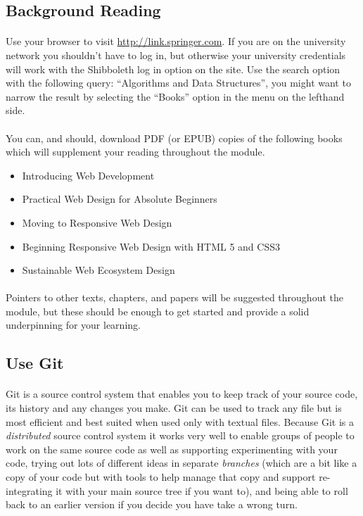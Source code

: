 \documentclass[10pt, a4paper]{article}
\begin{document}
\subsection{Background Reading}

\paragraph{} Use your browser to visit \url{http://link.springer.com}. If you are on the university network you shouldn't have to log in, but otherwise your university credentials will work with the Shibboleth log in option on the site. Use the search option with the following query: ``Algorithms and Data Structures'', you might want to narrow the result by selecting the ``Books'' option in the menu on the lefthand side.

\paragraph{} You can, and should, download PDF (or EPUB) copies of the following books which will supplement your reading throughout the module.

\begin{itemize}

\item Introducing Web Development
\item Practical Web Design for Absolute Beginners
\item Moving to Responsive Web Design
\item Beginning Responsive Web Design with HTML 5 and CSS3
\item Sustainable Web Ecosystem Design

\end{itemize}

\paragraph{} Pointers to other texts, chapters, and papers will be suggested throughout the module, but these should be enough to get started and provide a solid underpinning for your learning.

\subsection{ Use Git}
\paragraph{} Git is a source control system that enables you to keep track of your source code, its history and any changes you make. Git can be used to track any file but is most efficient and best suited when used only with textual files. Because Git is a \emph{distributed} source control system it works very well to enable groups of people to work on the same source code as well as supporting experimenting with your code, trying out lots of different ideas in separate \emph{branches} (which are a bit like a copy of your code but with tools to help manage that copy and support re-integrating it with your main source tree if you want to), and being able to roll back to an earlier version if you decide you have take a wrong turn.
\end{document}
